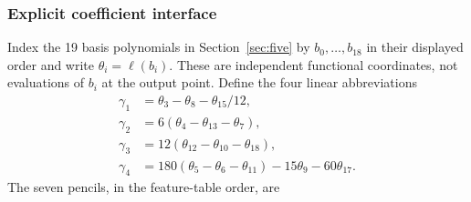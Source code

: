 \documentclass[pdflatex,sn-mathphys-num]{sn-jnl}
\theoremstyle{thmstyleone}
\theoremstyle{thmstyletwo}\newtheorem{remark}[theorem]{Remark}
\begin{document}
\subsubsection{Explicit coefficient interface}\label{app:coefficients}
Index the 19 basis polynomials in Section~\ref{sec:five} by $b_0,\ldots,b_{18}$
in their displayed order and write $\theta_i=\ell(b_i)$. These are independent
functional coordinates, not evaluations of $b_i$ at the output point.
Define the four linear abbreviations
\begin{align*}
\gamma_{1}&=\theta_{3}-\theta_{8}-\theta_{15}/12,\\
\gamma_{2}&=6(\theta_{4}-\theta_{13}-\theta_{7}),\\
\gamma_{3}&=12(\theta_{12}-\theta_{10}-\theta_{18}),\\
\gamma_{4}&=180(\theta_{5}-\theta_{6}-\theta_{11})-15\theta_{9}-60\theta_{17}.
\end{align*}
The seven pencils, in the feature-table order, are
\end{document}
